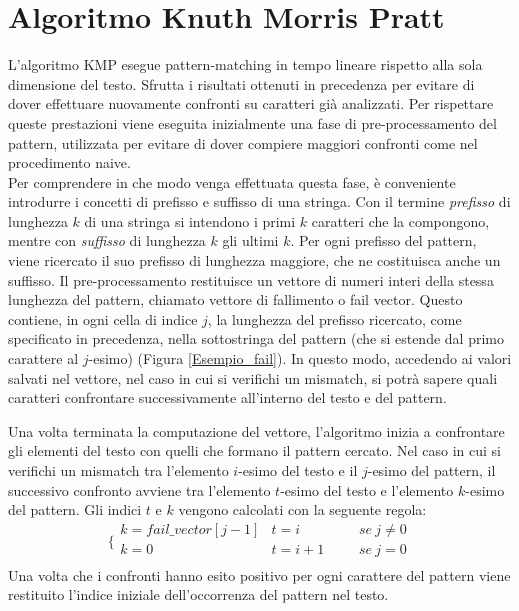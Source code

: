 \section{Algoritmo Knuth Morris Pratt}\label{KMP}
L'algoritmo KMP esegue pattern-matching in tempo lineare rispetto alla sola dimensione del testo. 
Sfrutta i risultati ottenuti in precedenza per evitare di dover effettuare nuovamente confronti su caratteri già analizzati. Per rispettare queste prestazioni viene eseguita inizialmente una fase di pre-processamento del pattern, utilizzata per evitare di dover compiere maggiori confronti come nel procedimento naive\cite{func}.\\ Per comprendere in che modo venga effettuata questa fase, è conveniente introdurre i concetti di prefisso e suffisso di una stringa.
Con il termine {\itshape prefisso} di lunghezza $k$  di una stringa si intendono i primi $k$ caratteri che la compongono, mentre con {\itshape suffisso} di lunghezza $k$ gli ultimi $k$.
Per ogni prefisso del pattern, viene ricercato il suo prefisso di lunghezza maggiore, che ne costituisca anche un suffisso. Il pre-processamento restituisce un vettore di numeri interi della stessa lunghezza del pattern, chiamato vettore di fallimento o fail vector. Questo contiene, in ogni cella di indice $j$, la lunghezza del prefisso ricercato, come specificato in precedenza, nella sottostringa del pattern (che si estende dal primo carattere al $j$-esimo) (Figura \ref{Esempio_fail}). In questo modo, accedendo ai valori salvati nel vettore, nel caso in cui si verifichi un mismatch, si potrà sapere quali caratteri confrontare successivamente all'interno del testo e del pattern.\\
\begin{comment}
\begin{figure}[h]
\centering
\texttt{[image: Path]}
\caption{\footnotesize{}}
\label{Esempio_fail}
\end{figure}
\end{comment}
Una volta terminata la computazione del vettore, l'algoritmo inizia a confrontare gli elementi del testo con quelli che formano il pattern cercato. Nel caso in cui si verifichi un mismatch tra l'elemento $i$-esimo del testo e il $j$-esimo del pattern, il successivo confronto avviene tra l'elemento $t$-esimo del testo e l'elemento $k$-esimo del pattern. Gli indici $t$ e $k$  vengono calcolati con la seguente regola: 
$$
\bigg\{
\begin{array}{llcl}
{k=fail\_vector[j-1]} & {t=i} & {\:\:\:\:} & {se\:j\ne 0} \\
{k=0} & {t=i+1} & {\:\:\:\:} & {se\:j = 0} \\
\end{array}
$$
Una volta che i confronti hanno esito positivo per ogni carattere del pattern viene restituito l'indice iniziale dell'occorrenza del pattern nel testo.\\ \\


